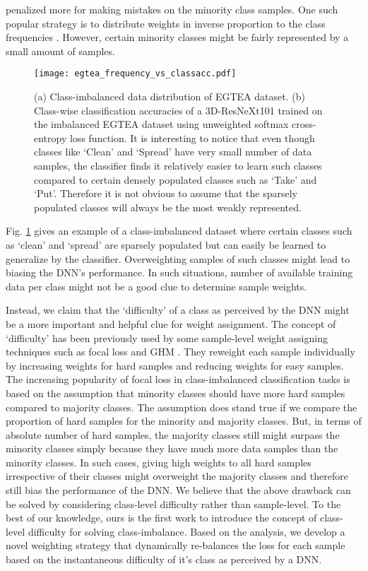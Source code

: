\documentclass[runningheads]{llncs}
\begin{document}
penalized more
for making mistakes on the minority class samples. One such popular strategy is 
to
distribute weights in inverse proportion to the class frequencies \cite{Inverse_freq1,Inverse_freq2}. 
However, certain minority classes might be fairly represented by a small amount of 
samples.
\begin{figure}[t]
\centering
\texttt{[image: egtea\_frequency\_vs\_classacc.pdf]}
\caption{
(a) Class-imbalanced data distribution of EGTEA dataset.
(b) Class-wise classification accuracies of a 3D-ResNeXt101
trained on the imbalanced EGTEA dataset using unweighted softmax cross-entropy loss function. It is interesting to notice that even though classes like ‘Clean’ and ‘Spread’ have very small
number of data samples, the classifier finds it relatively easier to learn such classes compared
to certain densely populated classes such as ‘Take’ and ‘Put’. Therefore it is not obvious to
assume that the sparsely populated classes will always be the most weakly represented.
}
\label{fig:egteafreq}
\end{figure}

Fig. \ref{fig:egteafreq} gives an example of a class-imbalanced dataset where certain classes such 
as
‘clean’ and ‘spread’ are sparsely populated but can easily be learned to 
generalize by
the classifier. Overweighting samples of such classes might lead to biasing the 
DNN’s
performance. In such situations, number of available training data per class 
might
not be a good clue to determine sample weights.

Instead, we claim that the ‘difficulty’ of a class as perceived by the DNN might 
be
a more important and helpful clue for weight assignment. The concept of 
‘difficulty’
has been previously used by some sample-level weight assigning techniques such
as focal loss \cite{FOCALloss} and GHM \cite{Gradient_harmonised}. They reweight each sample individually by 
increasing weights for hard samples and reducing weights for easy samples. The 
increasing
popularity of focal loss \cite{FOCALloss} in class-imbalanced classification tasks is based 
on the
assumption that minority classes should have more hard samples compared to 
majority classes. The assumption does stand true if we compare the proportion of 
hard
samples for the minority and majority classes. But, in terms of absolute number 
of
hard samples, the majority classes still might surpass the minority classes 
simply because they have much more data samples than the minority classes. In 
such cases,
giving high weights to all hard samples irrespective of their classes might 
overweight
the majority classes and therefore still bias the performance of the DNN. We 
believe
that the above drawback can be solved by considering class-level difficulty 
rather
than sample-level. To the best of our knowledge, ours is the first work to 
introduce
the concept of class-level difficulty for solving class-imbalance. Based on the 
analysis, we develop a novel weighting strategy that dynamically re-balances the 
loss for
each sample based on the instantaneous difficulty of it’s class as perceived by 
a DNN.
\end{document}
